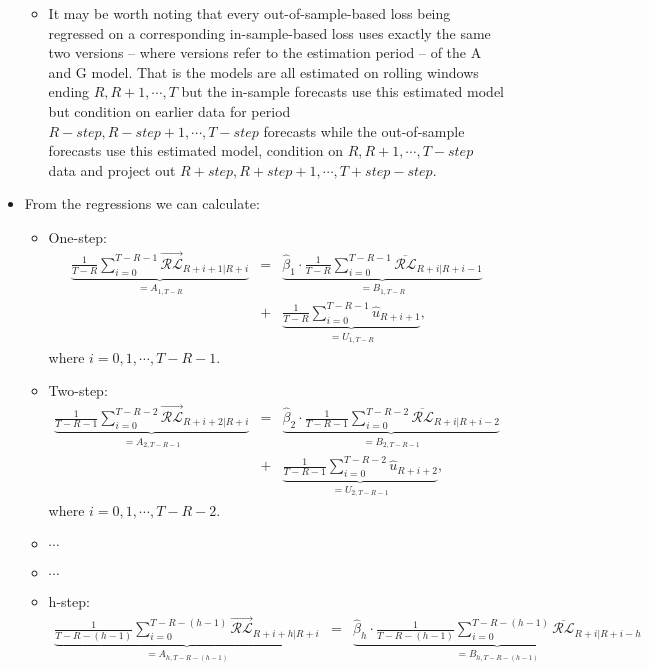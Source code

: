 \documentclass[11pt]{article}
\begin{document}
\begin{itemize}
\begin{itemize}
\item It may be worth noting that every out-of-sample-based loss being regressed on a corresponding in-sample-based loss uses exactly the same two versions -- where versions refer to the estimation period -- of the A and G model.  That is the models are all estimated on rolling windows ending $R, R+1, \cdots, T$ but the in-sample forecasts use this estimated model but condition on earlier data for period $R-step, R-step+1, \cdots, T-step$ forecasts while the out-of-sample forecasts use this estimated model, condition on $R, R+1, \cdots, T-step$ data and project out  $R+step, R+step+1, \cdots, T+step-step$.
\end{itemize}
\item From the regressions we can calculate:
\begin{itemize}
\item One-step: 
\begin{eqnarray}
\underbrace{\frac{1}{T\!-\!R}\!\!\sum_{i=0}^{T-R-1}\!\!\overrightarrow{\mathcal{RL}}_{R+i+1|R+i}}_{=A_{1,T\!-\!R}}
\!\!\!\!&=&\!\!\!\!\underbrace{\widehat{\beta}_{1}\cdot\frac{1}{T\!-\!R}\!\!\sum_{i=0}^{T-R-1}\!\!\overline{\mathcal{RL}}_{R+i|R+i-1}}_{=B_{1,T\!-\!R}} \nonumber \\
\!\!\!\!&+&\!\!\!\!\underbrace{\frac{1}{T\!-\!R}\!\!\sum_{i=0}^{T-R-1}\!\!\widehat{u}_{R+i+1}}_{=U_{1,T\!-\!R}}, \nonumber
\end{eqnarray}
where $i=0, 1, \cdots, T-R-1$.
\item Two-step: 
\begin{eqnarray}
\underbrace{\frac{1}{T\!-\!R\!-\!1}\!\!\sum_{i=0}^{T-R-2}\!\!\overrightarrow{\mathcal{RL}}_{R+i+2|R+i}}_{=A_{2,T\!-\!R\!-\!1}}
\!\!\!\!&=&\!\!\!\!\underbrace{\widehat{\beta}_{2}\cdot\frac{1}{T\!-\!R\!-\!1}\!\!\sum_{i=0}^{T-R-2}\!\!\overline{\mathcal{RL}}_{R+i|R+i-2}}_{=B_{2,T\!-\!R\!-\!1}} \nonumber \\
\!\!\!\!&+&\!\!\!\!\underbrace{\frac{1}{T\!-\!R\!-\!1}\!\!\sum_{i=0}^{T-R-2}\!\!\widehat{u}_{R+i+2}}_{=U_{2,T\!-\!R\!-\!1}}, \nonumber 
\end{eqnarray}
where $i=0, 1, \cdots, T-R-2$.
\item $\cdots$
\item $\cdots$
\item h-step: 
\begin{eqnarray}
\underbrace{\frac{1}{T\!-\!R\!-\!(h\!-\!1)}\!\!\sum_{i=0}^{T-R-(h-1)}\!\!\overrightarrow{\mathcal{RL}}_{R+i+h|R+i}}_{=A_{h,T\!-\!R\!-\!\!(h\!-\!1)}}
\!\!\!\!&=&\!\!\!\!\underbrace{\widehat{\beta}_{h}\cdot\frac{1}{T\!-\!R\!-\!(h\!-\!1)}\!\!\sum_{i=0}^{T-R-(h-1)}\!\!\overline{\mathcal{RL}}_{R+i|R+i-h}}_{=B_{h,T\!-\!R\!-\!(h\!-\!1)}} \nonumber \\

\end{eqnarray}
\end{itemize}
\end{itemize}
\end{document}
